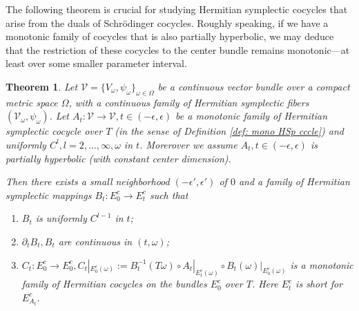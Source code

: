 \documentclass[11pt]{amsart}
\newtheorem{theorem}{Theorem}[section]
\theoremstyle{remark}
\theoremstyle{definition}
\newcommand{\V}{{\mathbf V}}
\def \V{\mathcal{V}}
\begin{document}
The following theorem is crucial for studying Hermitian symplectic cocycles that arise from the duals of Schrödinger cocycles.
Roughly speaking, if we have a monotonic family of cocycles that is also partially hyperbolic, we may deduce that the restriction of these cocycles to the center bundle remains monotonic—at least over some smaller parameter interval.
	\begin{theorem}\label{mon1}
Let $\V=\{V_\omega,\psi_\omega\}_{\omega\in \Omega}$ be a continuous vector bundle over a compact metric space $\Omega$, with a continuous family of Hermitian symplectic fibers $(\V_\omega,\psi_\omega)$.
Let $A_t: \V\to \V, t\in (-\epsilon,\epsilon)$ be a monotonic family of Hermitian symplectic cocycle  over $T$ (in the sense of Definition \ref{def: mono HSp cccle}) and uniformly $C^l, l=2,\dots,\infty, \omega$ in $t$. Morerover we assume $A_t, t\in (-\epsilon, \epsilon)$ is partially hyperbolic (with constant center dimension). 

Then there exists a small neighborhood $(-\epsilon',\epsilon')$ of $0$ and a family of Hermitian symplectic mappings $B_t: E_0^c\rightarrow E_t^c$ such that
\begin{enumerate}
    \item $B_t$ is uniformly $C^{l-1}$ in $t$;
    \item $\partial_tB_t, B_t$ are continuous in $(t,\omega)$;
    \item $C_t: E^c_0\to E^c_0, C_t|_{E^c_0(\omega)}:=B_t^{-1}(T\omega) \circ A_t|_{E_t^c(\omega)} \circ B_t(\omega)|_{E^c_0(\omega)}$ is a monotonic family of Hermitian cocycles on the bundles $E^c_0$ over $T$. Here $E^c_t$ is short for $E^c_{A_t}$.
\end{enumerate}


	\end{theorem}
\end{document}
